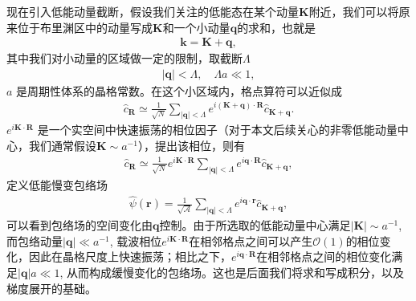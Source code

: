 \documentclass[10pt, oneside]{article}
\begin{document}
现在引入低能动量截断，假设我们关注的低能态在某个动量\(\bm{K}\)附近，我们可以将原来位于布里渊区中的动量写成\(\bm{K}\)和一个小动量\(\bm{q}\)的求和，也就是
\begin{align}
	\bm{k} = \bm{K} + \bm{q},
\end{align}
其中我们对小动量的区域做一定的限制，取截断\(\Lambda\) 
\begin{align}
	\left|\bm{q}\right| < \Lambda, \quad \Lambda a \ll 1,
\end{align}
\(a\) 是周期性体系的晶格常数。在这个小区域内，格点算符可以近似成
\begin{align}
	\hat{c}_{\bm{R}}  \simeq \frac{1}{\sqrt{N}} \sum_{\left|\bm{q}\right|  < \Lambda} e^{i \left(\bm{K} + \bm{q} \right) \cdot \bm{R}} \hat{c}_{\bm{K} + \bm{q}}.
\end{align}
\(e^{i \bm{K} \cdot \bm{R}}\) 是一个实空间中快速振荡的相位因子（对于本文后续关心的非零低能动量中心，我们通常假设\(\bm{K} \sim a^{-1}\)），提出该相位，则有
\begin{align}
	\hat{c}_{\bm{R}}  \simeq \frac{1}{\sqrt{N}}   e^{i \bm{K} \cdot \bm{R}} \sum_{\left|\bm{q}\right|  < \Lambda}  e^{i \bm{q} \cdot \bm{R}} \hat{c}_{\bm{K} + \bm{q}},
\end{align}
定义低能慢变包络场
\begin{align}
	\boxed{
		\hat{\psi}\left(\bm{r}\right) = \frac{1}{\sqrt{\mathcal{A}}} \sum_{\left|\bm{q}\right|  < \Lambda}  e^{i \bm{q} \cdot \bm{r}} \hat{c}_{\bm{K} + \bm{q}},
	}
\end{align}
可以看到包络场的空间变化由\(\bm{q}\)控制。由于所选取的低能动量中心满足\(\left|\bm{K}\right| \sim a^{-1}\), 而包络动量\(\left|\bm{q}\right| \ll a^{-1}\), 载波相位\(e^{i \bm{K} \cdot \bm{R}}\)在相邻格点之间可以产生\(\mathcal{O}\left(1\right)\)的相位变化，因此在晶格尺度上快速振荡；相比之下，\(e^{i \bm{q} \cdot \bm{R}}\)在相邻格点之间的相位变化满足\( \left|\bm{q}\right| a \ll 1\), 从而构成缓慢变化的包络场。这也是后面我们将求和写成积分，以及梯度展开的基础。
\end{document}
